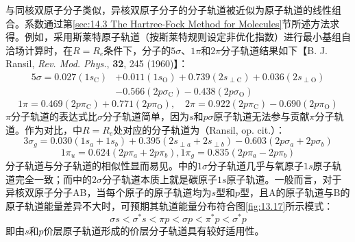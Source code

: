     与同核双原子分子类似，异核双原子分子的分子轨道被近似为原子轨道的线性组合。系数通过第\ref{sec:14.3 The Hartree-Fock Method for Molecules}节所述方法求得。例如，采用斯莱特原子轨道（按斯莱特规则设定非优化指数）进行最小基组自洽场计算时，在$R=R_e$条件下，分子的$5\sigma$、$1\pi$和$2\pi$分子轨道结果如下【B. J. Ransil, \textit{Rev. Mod. Phys.}, \textbf{32}, 245 (1960)】：
    \begin{equation*}
        \begin{aligned}
            5\sigma = 0.027\left(1s_{\mathrm{C}}\right) &+ 0.011\left(1s_{\mathrm{O}}\right) + 0.739\left(2s_{\perp {\mathrm{C}}}\right) + 0.036\left(2s_{\perp \mathrm{O}}\right) \\
            & -0.566\left(2p\sigma_{\mathrm{C}}\right)-0.438\left(2p\sigma_{\mathrm{O}}\right)
        \end{aligned}
    \end{equation*}
    \begin{equation*}
        1\pi = 0.469 \left(2p\pi_{\mathrm{C}}\right) + 0.771 \left(2p\pi_{\mathrm{O}}\right), \quad 2\pi = 0.922 \left(2p\pi_{\mathrm{C}}\right) - 0.690 \left(2p\pi_{\mathrm{O}}\right)
    \end{equation*}
    $\pi$分子轨道的表达式比$\sigma$分子轨道简单，因为$s$和$p\sigma$原子轨道无法参与贡献$\pi$分子轨道。作为对比，中$R = R_e$处对应的分子轨道为（Ransil, op. cit.）：
    \begin{equation*}
        3\sigma_g = 0.030 \left( 1s_a + 1s_b \right) + 0.395 \left( 2s_{\perp a} + 2s_{\perp b} \right) - 0.603 \left( 2p\sigma_a + 2p\sigma_b \right)
    \end{equation*}
    \begin{equation*}
        1\pi_u = 0.624 \left(2p\pi_a + 2p\pi_b\right), 1\pi_g = 0.835 \left(2p\pi_a - 2p\pi_b\right)
    \end{equation*}
    分子轨道与分子轨道的相似性显而易见。中的$1\sigma$分子轨道几乎与氧原子$1s$原子轨道完全一致；而中的$2\sigma$分子轨道本质上就是碳原子$1s$原子轨道。一般而言，对于异核双原子分子AB，当每个原子的原子轨道均为$s$型和$p$型，且A的原子轨道与B的原子轨道能量差异不大时，可预期其轨道能量分布符合图\ref{fig:13.17}所示模式：
    \begin{equation*}
        \sigma s < \sigma ^* s < \pi p < \sigma p < \pi ^* p < \sigma ^* p
    \end{equation*}
    即由$s$和$p$价层原子轨道形成的价层分子轨道具有较好适用性。

